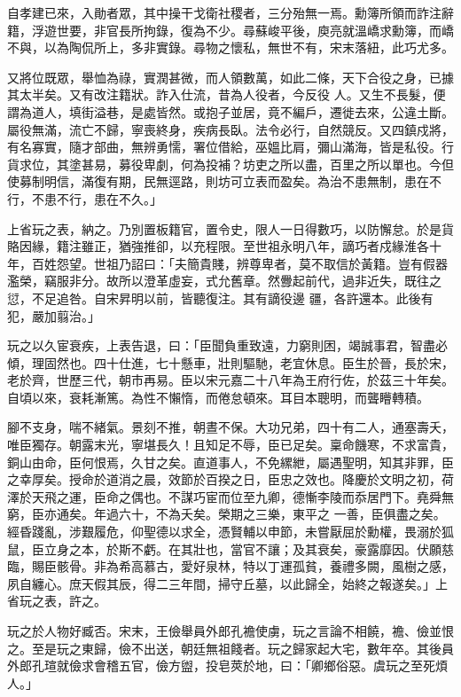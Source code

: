 \begin{pinyinscope}
 自孝建已來，入勛者眾，其中操干戈衛社稷者，三分殆無一焉。勳簿所領而詐注辭籍，浮遊世要，非官長所拘錄，復為不少。尋蘇峻平後，庾亮就溫嶠求勳簿，而嶠不與，以為陶侃所上，多非實錄。尋物之懷私，無世不有，宋末落紐，此巧尤多。



 又將位既眾，舉恤為祿，實潤甚微，而人領數萬，如此二條，天下合役之身，已據其太半矣。又有改注籍狀。詐入仕流，昔為人役者，今反役
 人。又生不長髮，便謂為道人，填街溢巷，是處皆然。或抱子並居，竟不編戶，遷徙去來，公違土斷。屬役無滿，流亡不歸，寧喪終身，疾病長臥。法令必行，自然競反。又四鎮戍將，有名寡實，隨才部曲，無辨勇懦，署位借給，巫媼比肩，彌山滿海，皆是私役。行貨求位，其塗甚易，募役卑劇，何為投補？坊吏之所以盡，百里之所以單也。今但使募制明信，滿復有期，民無逕路，則坊可立表而盈矣。為治不患無制，患在不行，不患不行，患在不久。」



 上省玩之表，納之。乃別置板籍官，置令史，限人一日得數巧，以防懈怠。於是貨賂因緣，籍注雖正，猶強推卻，以充程限。至世祖永明八年，謫巧者戍緣淮各十年，百姓怨望。世祖乃詔曰：「夫簡貴賤，辨尊卑者，莫不取信於黃籍。豈有假器濫榮，竊服非分。故所以澄革虛妄，式允舊章。然釁起前代，過非近失，既往之愆，不足追咎。自宋昇明以前，皆聽復注。其有謫役邊
 疆，各許還本。此後有犯，嚴加翦治。」



 玩之以久宦衰疾，上表告退，曰：「臣聞負重致遠，力窮則困，竭誠事君，智盡必傾，理固然也。四十仕進，七十懸車，壯則驅馳，老宜休息。臣生於晉，長於宋，老於齊，世歷三代，朝市再易。臣以宋元嘉二十八年為王府行佐，於茲三十年矣。自頃以來，衰耗漸篤。為性不懶惰，而倦怠頓來。耳目本聰明，而聾矒轉積。



 腳不支身，喘不緒氣。景刻不推，朝晝不保。大功兄弟，四十有二人，通塞壽夭，唯臣獨存。朝露末光，寧堪長久！且知足不辱，臣已足矣。稟命饑寒，不求富貴，銅山由命，臣何恨焉，久甘之矣。直道事人，不免縲紲，屬遇聖明，知其非罪，臣之幸厚矣。授命於道消之晨，效節於百揆之日，臣忠之效也。降慶於文明之初，荷澤於天飛之運，臣命之偶也。不謀巧宦而位至九卿，德慚李陵而忝居門下。堯舜無窮，臣亦通矣。年過六十，不為夭矣。榮期之三樂，東平之
 一善，臣俱盡之矣。經昏踐亂，涉艱履危，仰聖德以求全，憑賢輔以申節，未嘗厭屈於勳權，畏溺於狐鼠，臣立身之本，於斯不虧。在其壯也，當官不讓；及其衰矣，豪露靡因。伏願慈臨，賜臣骸骨。非為希高慕古，愛好泉林，特以丁運孤貧，養禮多闕，風樹之感，夙自纏心。庶天假其辰，得二三年間，掃守丘墓，以此歸全，始終之報遂矣。」上省玩之表，許之。



 玩之於人物好臧否。宋末，王儉舉員外郎孔襜使虜，玩之言論不相饒，襜、儉並恨之。至是玩之東歸，儉不出送，朝廷無祖餞者。玩之歸家起大宅，數年卒。其後員外郎孔瑄就儉求會稽五官，儉方盥，投皂莢於地，曰：「卿鄉俗惡。虞玩之至死煩人。」




\end{pinyinscope}
